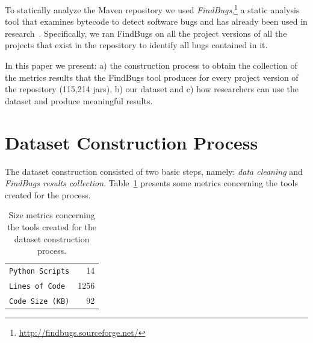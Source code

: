 \documentclass{sig-alternate}
\begin{document}
To statically analyze the Maven repository
we used {\it FindBugs},\footnote{\small \url{http://findbugs.sourceforge.net/}}
a static analysis tool that examines bytecode to detect software bugs
and has already been used in research~\cite{AP10,SHP06}.
Specifically, we ran FindBugs on all the project versions of all
the projects that exist in the repository
to identify all bugs contained in it.

In this paper we present: a) the construction process to obtain the
collection of the metrics results that the FindBugs tool produces 
for every project version of the repository (115,214 {\sc jar}s),
b) our dataset
and c) how researchers can use the dataset and produce
meaningful results.

\begin{table}
\centering
{}
\caption{Descriptive statistic measurements for the Maven repository.}
\label{tbl:repository}
\end{table}

\section{Dataset Construction Process}
\label{sec:exp}

The dataset construction consisted of two basic steps,
namely: {\it data cleaning} and {\it FindBugs results
collection}. Table~\ref{tbl:tools-size} presents some
metrics concerning the tools created for
the process.

\begin{table}
\centering
\begin{tabular}{l r}
 \hline
\verb|Python Scripts| & 14\\
\verb|Lines of Code| & 1256\\
\verb|Code Size (KB)| & 92\\
\hline
\end{tabular}
\caption{Size metrics concerning
the tools created for
the dataset construction process.}
\label{tbl:tools-size}
\end{table}
\end{document}
